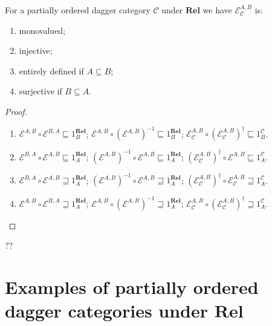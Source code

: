 \begin{prop}
  For a partially ordered dagger category $\mathcal{C}$ under
  $\mathbf{Rel}$ we have $\mathcal{E}_{\mathcal{C}}^{A,B}$ is:
  \begin{enumerate}
    \item monovalued;
    
    \item injective;
    
    \item entirely defined if $A \subseteq B$;
    
    \item surjective if $B \subseteq A$.
  \end{enumerate}
\end{prop}

\begin{proof}
  ~
  \begin{enumerate}
    \item $\mathcal{E}^{A,B} \circ \mathcal{E}^{B,A} \sqsubseteq
    1^{\mathbf{Rel}}_B$; $\mathcal{E}^{A,B} \circ (\mathcal{E}^{A,B})^{- 1} \sqsubseteq 1^{\mathbf{Rel}}_B$;
    $\mathcal{E}_{\mathcal{C}}^{A,B} \circ (\mathcal{E}_{\mathcal{C}}^{A,B})^{\dagger} \sqsubseteq 1^{\mathcal{C}}_B$.
    
    \item $\mathcal{E}^{B,A} \circ \mathcal{E}^{A,B} \sqsubseteq
    1^{\mathbf{Rel}}_A$; $(\mathcal{E}^{A,B})^{- 1} \circ \mathcal{E}^{A,B} \sqsubseteq 1^{\mathbf{Rel}}_A$;
    $(\mathcal{E}_{\mathcal{C}}^{A,B})^{\dagger} \circ \mathcal{E}^{A,B} \sqsubseteq 1^{\mathcal{C}}_A$.
    
    \item $\mathcal{E}^{B,A} \circ \mathcal{E}^{A,B} \sqsupseteq
    1^{\mathbf{Rel}}_A$; $(\mathcal{E}^{A,B})^{- 1} \circ \mathcal{E}^{A,B} \sqsupseteq 1^{\mathbf{Rel}}_A$;
    $(\mathcal{E}_{\mathcal{C}}^{A,B})^{\dagger} \circ \mathcal{E}_{\mathcal{C}}^{A,B} \sqsupseteq 1^{\mathcal{C}}_A$.
    
    \item $\mathcal{E}^{A,B} \circ \mathcal{E}^{B,A} \sqsupseteq
    1^{\mathbf{Rel}}_A$; $\mathcal{E}^{A,B} \circ (\mathcal{E}^{A,B})^{- 1} \sqsupseteq 1^{\mathbf{Rel}}_A$;
    $\mathcal{E}_{\mathcal{C}}^{A,B} \circ (\mathcal{E}_{\mathcal{C}}^{A,B})^{\dagger} \sqsupseteq 1^{\mathcal{C}}_A$.
  \end{enumerate}
\end{proof}

??

\section{\texorpdfstring{Examples of partially ordered dagger categories under
$\mathbf{Rel}$}{Examples of partially ordered dagger categories under Rel}}

